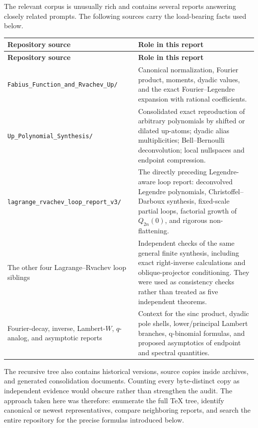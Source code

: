 \documentclass[11pt,oneside]{article}
\numberwithin{equation}{section}
\theoremstyle{definition}
\theoremstyle{remark}
\begin{document}
The relevant corpus is unusually rich and contains several reports answering
closely related prompts.  The following sources carry the load-bearing facts
used below.

\begin{longtable}{@{}p{}p{}@{}}
\toprule
\textbf{Repository source} & \textbf{Role in this report}\\
\midrule
\endfirsthead
\toprule
\textbf{Repository source} & \textbf{Role in this report}\\
\midrule
\endhead
{\footnotesize\nolinkurl{Fabius_Function_and_Rvachev_Up/}} &
Canonical normalization, Fourier product, moments, dyadic values, and the exact
Fourier--Legendre expansion with rational coefficients.\\
{\footnotesize\nolinkurl{Up_Polynomial_Synthesis/}} &
Consolidated exact reproduction of arbitrary polynomials by shifted or dilated
up-atoms; dyadic alias multiplicities; Bell--Bernoulli deconvolution; local
nullspaces and endpoint compression.\\
{\footnotesize\nolinkurl{lagrange_rvachev_loop_report_v3/}} &
The directly preceding Legendre-aware loop report: deconvolved Legendre
polynomials, Christoffel--Darboux synthesis, fixed-scale partial loops,
factorial growth of $Q_{2n}(0)$, and rigorous non-flattening.\\
The other four Lagrange--Rvachev loop siblings &
Independent checks of the same general finite synthesis, including exact
right-inverse calculations and oblique-projector conditioning.  They were
used as consistency checks rather than treated as five independent theorems.\\
Fourier-decay, inverse, Lambert-$W$, $q$-analog, and asymptotic reports &
Context for the sinc product, dyadic pole shells, lower/principal Lambert
branches, q-binomial formulas, and proposed asymptotics of endpoint and
spectral quantities.\\
\bottomrule
\end{longtable}

The recursive tree also contains historical versions, source copies inside
archives, and generated consolidation documents.  Counting every byte-distinct
copy as independent evidence would obscure rather than strengthen the audit.
The approach taken here was therefore: enumerate the full TeX tree, identify
canonical or newest representatives, compare neighboring reports, and search
the entire repository for the precise formulas introduced below.
\end{document}
